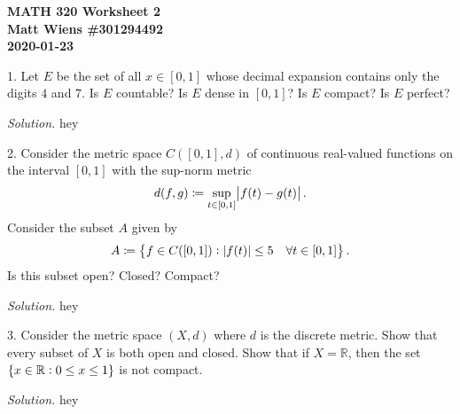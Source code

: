 \documentclass{article}
\newcommand{\R}{\mathbb{R}}
\begin{document}
\textbf{MATH 320 Worksheet 2} \\
\textbf{Matt Wiens \#301294492} \\
\textbf{2020-01-23}

1. Let $E$ be the set of all $x \in [0, 1]$ whose decimal expansion
   contains only the digits $4$ and $7$. Is $E$ countable? Is $E$ dense
   in $[0, 1]$? Is $E$ compact? Is $E$ perfect?

\textit{Solution.}
hey

\newpage

2. Consider the metric space $C([0, 1], d)$ of continuous real-valued
   functions on the interval $[0, 1]$ with the sup-norm metric
%
\begin{equation*}
    d(f, g) \coloneqq \sup_{t \in [0, 1]} \envert{f(t) - g(t)}
    .
\end{equation*}
%
Consider the subset $A$ given by
%
\begin{equation*}
    A \coloneqq \cbr{f \in C([0, 1]): |f(t)| \leq 5 \quad \forall t \in [0, 1]}
    .
\end{equation*}
%
Is this subset open? Closed? Compact?

\textit{Solution.}
hey

\newpage

3. Consider the metric space $(X, d)$ where $d$ is the discrete metric.
   Show that every subset of $X$ is both open and closed. Show that if
   $X = \R$, then the set $\cbr{x \in \R: 0 \leq x \leq 1}$ is not
   compact.

\textit{Solution.}
hey
\end{document}
